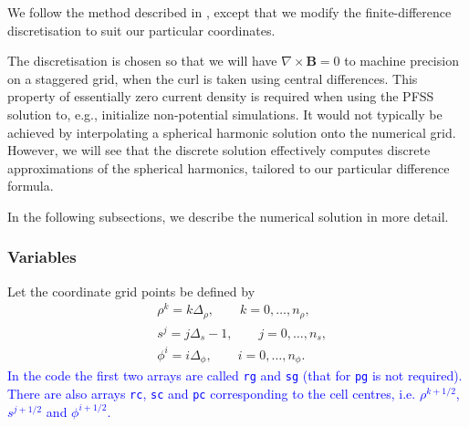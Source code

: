 \documentclass[11pt]{article}
\newcommand{\dr}{\Delta_\rho}
\newcommand{\ds}{\Delta_s}
\newcommand{\dph}{\Delta_\phi}
\newcommand{\Bb}{\boldsymbol{B}}
\begin{document}
We follow the method described in \cite{vanballe2000}, except that we modify the finite-difference discretisation to suit our particular coordinates.

The discretisation is chosen so that we will have $\nabla\times\Bb=0$ to machine precision on a staggered grid, when the curl is taken using central differences. This property of essentially zero current density is required when using the PFSS solution to, e.g., initialize non-potential simulations. It would not typically be achieved by interpolating a spherical harmonic solution onto the numerical grid. However, we will see that the discrete solution effectively computes discrete approximations of the spherical harmonics, tailored to our particular difference formula.

In the following subsections, we describe the numerical solution in more detail.

\subsubsection{Variables}

Let the coordinate grid points be defined by
\begin{align*}
&\rho^k = k\dr, \qquad k=0,\ldots, n_\rho,\\
&s^j = j\ds - 1, \qquad j=0,\ldots, n_s,\\
&\phi^i = i\dph, \qquad i=0,\ldots, n_\phi.
\end{align*}
\textcolor{blue}{In the code the first two arrays are called \texttt{rg} and \texttt{sg} (that for \texttt{pg} is not required). There are also arrays \texttt{rc},  \texttt{sc} and \texttt{pc} corresponding to the cell centres, i.e. $\rho^{k+1/2}$, $s^{j+1/2}$ and $\phi^{i+1/2}$.}
\end{document}
